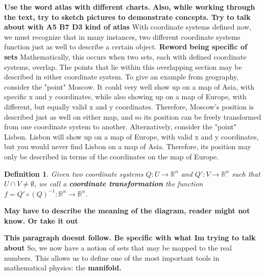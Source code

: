 \documentclass{book}
\newtheorem{defn}[equation]{Definition}
\begin{document}
\textbf{Use the word atlas with different charts. Also, while working through the text, try to sketch pictures to demonstrate concepts. Try to talk about with A5 B7 D3 kind of atlas}
With coordinate systems defined now, we must recognize that in many instances, two different coordinate systems function just as well to describe a certain object. \textbf{Reword being specific of sets} Mathematically, this occurs when two sets, each with defined coordinate systems, overlap. The points that lie within this overlapping section may be described in either coordinate system. To give an example from geography, consider the "point" Moscow. It could very well show up on a map of Asia, with specific x and y coordinates, while also showing up on a map of Europe, with different, but equally valid x and y coordinates. Therefore, Moscow's position is described just as well on either map, and so its position can be freely transformed from one coordinate system to another. Alternatively, consider the "point" Lisbon. Lisbon will show up on a map of Europe, with valid x and y coordinates, but you would never find Lisbon on a map of Asia. Therefore, its position may only be described in terms of the coordinates on the map of Europe.


\begin{defn}
	Given two coordinate systems  $Q : U \to \mathbb{R}^n$ and $Q' : V \to \mathbb{R}^n$ such that $U \cap V \neq \emptyset$, we call a \textbf{coordinate transformation} the function $f = Q' \circ (Q)^{-1} : \mathbb{R}^n \to \mathbb{R}^n$.
\end{defn}



\textbf{May have to describe the meaning of the diagram, reader might not know. Or take it out}


\textbf{This paragraph doesnt follow. Be specific with what Im trying to talk about}
So, we now have a notion of sets that may be mapped to the real numbers. This allows us to define one of the most important tools in mathematical physics: the \textbf{manifold.}
\end{document}
